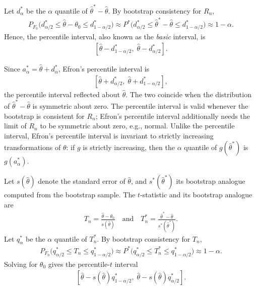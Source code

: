 \documentclass[a4paper,12pt]{article}
\begin{document}
\begin{definition}[Percentile]
	Let $d_\alpha^*$ be the $\alpha$ quantile of $\widehat\theta^*-\widehat\theta$.
	By bootstrap consistency for $R_n$,
	\begin{align}
		P_{F_0}\bigl(d_{\alpha/2}^*\le\widehat\theta-\theta_0\le d_{1-\alpha/2}^*\bigr)
		\approx P^*\bigl(d_{\alpha/2}^*\le\widehat\theta^*-\widehat\theta\le d_{1-\alpha/2}^*\bigr)
		\approx1-\alpha.
	\end{align}
	Hence, the percentile interval, also known as the \emph{basic} interval, is
	\begin{align}
		\left[\widehat\theta-d_{1-\alpha/2}^*,\;\widehat\theta-d_{\alpha/2}^*\right].
	\end{align}
\end{definition}

\begin{remark}[Relations]
	Since $a_\alpha^*=\widehat\theta+d_\alpha^*$, Efron's percentile interval is
	\begin{align}
		\left[\widehat\theta+d_{\alpha/2}^*,\;\widehat\theta+d_{1-\alpha/2}^*\right],
	\end{align}
	the percentile interval reflected about $\widehat\theta$.
	The two coincide when the distribution of $\widehat\theta^*-\widehat\theta$ is symmetric about zero.
	The percentile interval is valid whenever the bootstrap is consistent for $R_n$;
	Efron's percentile interval additionally needs the limit of $R_n$ to be symmetric about zero, e.g., normal.
	Unlike the percentile interval, Efron's percentile interval is invariant to strictly increasing transformations of $\theta$:
	if $g$ is strictly increasing, then the $\alpha$ quantile of $g(\widehat\theta^*)$ is $g(a_\alpha^*)$.
\end{remark}

\begin{definition}[Percentile-$t$]
	Let $s(\widehat\theta)$ denote the standard error of $\widehat\theta$, and $s^*(\widehat\theta^*)$ its bootstrap analogue computed from the bootstrap sample.
	The $t$-statistic and its bootstrap analogue are
	\begin{align}
		T_n = \frac{\widehat\theta-\theta_0}{s(\widehat\theta)}
		\quad\text{and}\quad
		T_n^* = \frac{\widehat\theta^*-\widehat\theta}{s^*(\widehat\theta^*)}.
	\end{align}
	Let $q_\alpha^*$ be the $\alpha$ quantile of $T_n^*$.
	By bootstrap consistency for $T_n$,
	\begin{align}
		P_{F_0}\bigl(q_{\alpha/2}^*\le T_n\le q_{1-\alpha/2}^*\bigr)
		\approx P^*\bigl(q_{\alpha/2}^*\le T_n^*\le q_{1-\alpha/2}^*\bigr)
		\approx1-\alpha.
	\end{align}
	Solving for $\theta_0$ gives the percentile-$t$ interval
	\begin{align}
		\left[\widehat\theta-s(\widehat\theta)q_{1-\alpha/2}^*,\;\widehat\theta-s(\widehat\theta)q_{\alpha/2}^*\right].
	\end{align}
\end{definition}
\end{document}
